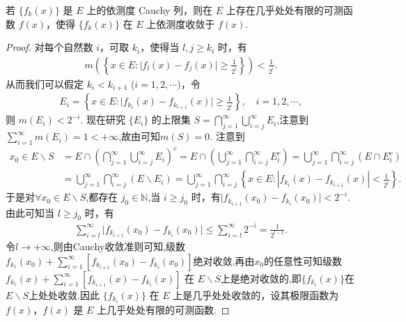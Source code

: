 \documentclass[../../main.tex]{subfiles}%
\begin{document}
\begin{theorem}\label{theorem:定理3.16}
若 $\{f_k(x)\}$ 是 $E$ 上的依测度 Cauchy 列，则在 $E$ 上存在几乎处处有限的可测函数 $f(x)$，使得 $\{f_k(x)\}$ 在 $E$ 上依测度收敛于 $f(x)$.
\end{theorem}
\begin{proof}

对每个自然数 $i$，可取 $k_i$，使得当 $l,j\geqslant k_i$ 时，有
\begin{align*}
m\left(\left\{x\in E:\vert f_l(x)-f_j(x)\vert\geqslant\frac{1}{2^i}\right\}\right)<\frac{1}{2^i}.
\end{align*}
从而我们可以假定 $k_i<k_{i + 1}$ ($i = 1,2,\cdots$)，令
\begin{align*}
E_i=\left\{x\in E:\vert f_{k_i}(x)-f_{k_{i + 1}}(x)\vert\geqslant\frac{1}{2^i}\right\},\quad i = 1,2,\cdots,
\end{align*}
则 $m(E_i)<2^{-i}$. 现在研究 $\{E_i\}$ 的上限集 $S = \bigcap_{j = 1}^{\infty}\bigcup_{i = j}^{\infty}E_i$,注意到$\sum_{i = 1}^{\infty}m(E_i)=1<+\infty$,故由可知$m(S)=0$. 注意到
\begin{align*}
x_0\in E\backslash S&=E\cap \left( \bigcap_{j=1}^{\infty}{\bigcup_{i=j}^{\infty}{E_i}} \right) ^c=E\cap \left( \bigcup_{j=1}^{\infty}{\bigcap_{i=j}^{\infty}{E_{i}^{c}}} \right) =\bigcup_{j=1}^{\infty}{\bigcap_{i=j}^{\infty}{\left( E\cap E_{i}^{c} \right)}}
\\
&=\bigcup_{j=1}^{\infty}{\bigcap_{i=j}^{\infty}{\left( E\backslash E_i \right)}}=\bigcup_{j=1}^{\infty}{\bigcap_{i=j}^{\infty}{\left\{ x\in E:\left| f_{k_i}\left( x \right) -f_{k_{i+1}}\left( x \right) \right|<\frac{1}{2^i} \right\}}.}
\end{align*}
于是对$\forall x_0\in E\backslash S$,都存在 $j_0\in \mathbb{N}$,当 $i\geqslant j_0$ 时，有$\vert f_{k_{i + 1}}(x_0)-f_{k_i}(x_0)\vert<2^{-i}$. 由此可知当 $l\geqslant j_0$ 时，有
\begin{align*}
\sum_{i = l}^{\infty}\vert f_{k_{i + 1}}(x_0)-f_{k_i}(x_0)\vert\leqslant \sum_{i=l}^{\infty}{2^{-i}} = \frac{1}{2^{l - 1}}.
\end{align*}
令$l\to +\infty$,则由Cauchy收敛准则可知,级数$f_{k_1}(x_0)+\sum_{i=1}^{\infty}[f_{k_{i+1}}(x_0)-f_{k_i}(x_0)]$绝对收敛,再由$x_0$的任意性可知级数$f_{k_1}(x)+\sum_{i = 1}^{\infty}[f_{k_{i + 1}}(x)-f_{k_i}(x)]$ 在 $E\backslash S$上是绝对收敛的,即$\{f_{k_i}(x)\}$在$E\backslash S$上处处收敛.因此 $\{f_{k_i}(x)\}$ 在 $E$ 上是几乎处处收敛的，设其极限函数为 $f(x)$，$f(x)$ 是 $E$ 上几乎处处有限的可测函数.


\end{proof}
\end{document}

